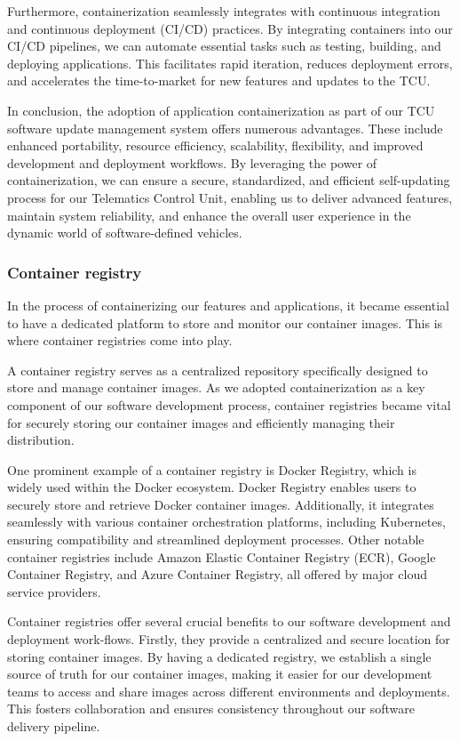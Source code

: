 \documentclass[
12pt,
oneside, 
onehalfspacing, 
nolistspacing, 
parskip, 
chapterinoneline, 
]{AASTCOMPUTER}
\begin{document}
Furthermore, containerization seamlessly integrates with continuous integration and continuous deployment (CI/CD) practices. By integrating containers into our CI/CD pipelines, we can automate essential tasks such as testing, building, and deploying applications. This facilitates rapid iteration, reduces deployment errors, and accelerates the time-to-market for new features and updates to the TCU.

In conclusion, the adoption of application containerization as part of our TCU software update management system offers numerous advantages. These include enhanced portability, resource efficiency, scalability, flexibility, and improved development and deployment workflows. By leveraging the power of containerization, we can ensure a secure, standardized, and efficient self-updating process for our Telematics Control Unit, enabling us to deliver advanced features, maintain system reliability, and enhance the overall user experience in the dynamic world of software-defined vehicles.

\subsubsection{Container registry}
In the process of containerizing our features and applications, it became essential to have a dedicated platform to store and monitor our container images. This is where container registries come into play.

A container registry serves as a centralized repository specifically designed to store and manage container images. As we adopted containerization as a key component of our software development process, container registries became vital for securely storing our container images and efficiently managing their distribution.

One prominent example of a container registry is Docker Registry, which is widely used within the Docker ecosystem. Docker Registry enables users to securely store and retrieve Docker container images. Additionally, it integrates seamlessly with various container orchestration platforms, including Kubernetes, ensuring compatibility and streamlined deployment processes. Other notable container registries include Amazon Elastic Container Registry (ECR), Google Container Registry, and Azure Container Registry, all offered by major cloud service providers.

Container registries offer several crucial benefits to our software development and deployment work-flows. Firstly, they provide a centralized and secure location for storing container images. By having a dedicated registry, we establish a single source of truth for our container images, making it easier for our development teams to access and share images across different environments and deployments. This fosters collaboration and ensures consistency throughout our software delivery pipeline.
\end{document}
